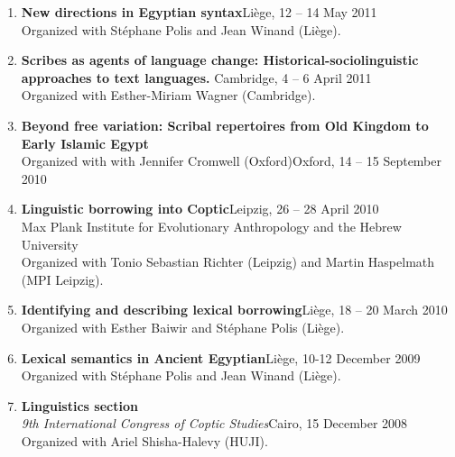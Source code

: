 \documentclass[letterpaper,11pt]{article}
\begin{document}
\begin{enumerate}
\item \textbf{New directions in Egyptian syntax}\hfill{Li\`{e}ge, 12 -- 14 May 2011}\\Organized with St\'{e}phane Polis and Jean Winand (Li\`ege). 

\item \textbf{Scribes as agents of language change: Historical-sociolinguistic approaches to text languages.}\hfill{ Cambridge, 4 -- 6 April 2011}\\Organized with Esther-Miriam Wagner (Cambridge).

\item \textbf{Beyond free variation: Scribal repertoires from Old Kingdom to Early Islamic Egypt}\\
Organized with with Jennifer Cromwell (Oxford)\hfill{Oxford, 14 -- 15 September 2010}

\item \textbf{Linguistic borrowing into Coptic}\hfill{Leipzig, 26 -- 28 April 2010}\\ Max Plank Institute for Evolutionary Anthropology and the Hebrew University\\Organized with Tonio Sebastian Richter (Leipzig) and Martin Haspelmath (MPI Leipzig). 

\item \textbf{Identifying and describing lexical borrowing}\hfill{Li\`{e}ge, 18 -- 20 March 2010}\\Organized with Esther Baiwir and St\'{e}phane Polis (Li\`ege).

\item \textbf{Lexical semantics in Ancient Egyptian}\hfill {Li\`{e}ge, 10-12 December 2009}\\Organized with St\'{e}phane Polis and Jean Winand (Li\`{e}ge).
%
\item \textbf{Linguistics section}\\
\textit{9th International Congress of Coptic Studies}\hfill{Cairo, 15 December 2008}\\Organized with Ariel Shisha-Halevy (HUJI).
\end{enumerate}
\end{document}
